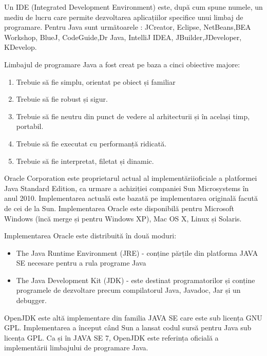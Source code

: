 \documentclass[12pt]{book}
\begin{document}
Un IDE (Integrated Development Environment) este, după cum spune numele, un mediu de lucru care permite dezvoltarea aplicațiilor specifice unui limbaj de programare. Pentru Java sunt următoarele : JCreator, Eclipse, NetBeans,BEA Workshop, BlueJ, CodeGuide,Dr Java, IntelliJ IDEA, JBuilder,JDeveloper, KDevelop.
	
Limbajul de programare Java a fost creat pe baza a cinci obiective majore:
\begin{addmargin}[4em]{1em}
\begin{enumerate}
	\item Trebuie să fie simplu, orientat pe obiect și familiar		\item Trebuie să fie robust și sigur.
	\item Trebuie să fie neutru din punct de vedere al arhitecturii și în același timp, portabil.
	\item Trebuie să fie executat cu performanță ridicată.
	\item Trebuie să fie interpretat, filetat și dinamic.
\end{enumerate}
\end{addmargin}
\bigbreak
Oracle Corporation este proprietarul actual al implementăriioficiale a platformei Java Standard Edition, ca urmare a achiziției companiei Sun Microsystems în anul 2010. Implementarea actuală este bazată pe implementarea originală facută de cei de la Sun. Implementarea Oracle este disponibilă pentru Microsoft Windows (încă merge și pentru Windows XP), Mac OS X, Linux și Solaris.
	
Implementarea Oracle este distribuită în două moduri:
\begin{addmargin}[4em]{1em}
\begin{itemize}
\item The Java Runtime Environment (JRE) - conține părțile din platforma JAVA SE necesare pentru a rula programe Java 
\item The Java Development Kit (JDK) - este destinat programatorilor și conține programele de dezvoltare precum compilatorul Java, Javadoc, Jar și un debugger.	
\end{itemize}
\end{addmargin}
\bigbreak
OpenJDK este altă implementare din familia JAVA SE care este sub licența GNU GPL. Implementarea a început când Sun a lansat codul sursă pentru Java sub licența GPL. Ca și în JAVA SE 7, OpenJDK este referința oficială a implementării limbajului de programare Java.
\end{document}
